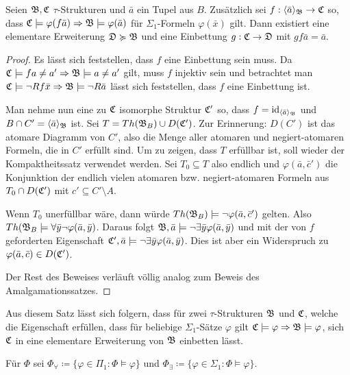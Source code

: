 \begin{satz}
	Seien $\mathfrak{B},\mathfrak{C}$ $\tau$-Strukturen und $\bar{a}$ ein Tupel aus $B$. Zusätzlich sei $f:\langle\bar{a}\rangle_{\mathfrak{B}}\to\mathfrak{C}$ so, dass $\mathfrak{C}\models\varphi(f\bar{a})\Rightarrow\mathfrak{B}\models\varphi(\bar{a})$ für $\Sigma_1$-Formeln $\varphi(\bar{x})$ gilt. Dann existiert eine elementare Erweiterung $\mathfrak{D}\succcurlyeq\mathfrak{B}$ und eine Einbettung $g:\mathfrak{C}\to\mathfrak{D}$ mit $gf\bar{a}=\bar{a}$.
\end{satz}
\begin{proof}
	Es lässt sich feststellen, dass $f$ eine Einbettung sein muss. Da $\mathfrak{C}\models fa\neq a'\Rightarrow \mathfrak{B}\models a\neq a'$ gilt, muss $f$ injektiv sein und betrachtet man $\mathfrak{C}\models\neg Rf\bar{x}\Rightarrow\mathfrak{B}\models\neg R\bar{a}$ lässt sich feststellen, dass $f$ eine Einbettung ist.
	
	Man nehme nun eine zu $\mathfrak{C}$ isomorphe Struktur $\mathfrak{C}'$ so, dass $f=\text{id}_{\langle\bar{a}\rangle_{\mathfrak{B}}}$ und $B\cap C'=\langle\bar{a}\rangle_{\mathfrak{B}}$ ist. Sei $T=Th(\mathfrak{B}_B)\cup D(\mathfrak{C}')$. Zur Erinnerung: $D(C')$ ist das atomare Diagramm von $C'$, also die Menge aller atomaren und negiert-atomaren Formeln, die in $C'$ erfüllt sind. 
	Um zu zeigen, dass $T$ erfüllbar ist, soll wieder der Kompaktheitssatz verwendet werden. 
	Sei $T_0\subseteq T$ also endlich und $\varphi(\bar{a},\bar{c}')$ die Konjunktion der endlich vielen atomaren bzw. negiert-atomaren Formeln aus $T_0\cap D(\mathfrak{C}')$ mit $c'\subseteq C'\setminus A$.
	
	Wenn $T_0$ unerfüllbar wäre, dann würde $Th(\mathfrak{B}_B)\models\neg\varphi(\bar{a},\bar{c}')$ gelten. Also $Th(\mathfrak{B}_B\models\forall\bar{y}\neg\varphi(\bar{a},\bar{y})$. Daraus folgt $\mathfrak{B},\bar{a}\models\neg\exists\bar{y}\varphi(\bar{a},\bar{y})$ und mit der von $f$ geforderten Eigenschaft $\mathfrak{C}',\bar{a}\models\neg\exists\bar{y}\varphi(\bar{a},\bar{y})$. Dies ist aber ein Widerspruch zu $\varphi(\bar{a},\bar{c})\in D(\mathfrak{C}')$.
	
	Der Rest des Beweises verläuft völlig analog zum Beweis des Amalgamationssatzes.
 \end{proof}
 
 Aus diesem Satz lässt sich folgern, dass für zwei $\tau$-Strukturen $\mathfrak{B}$ und $\mathfrak{C}$, welche die Eigenschaft erfüllen, dass für beliebige $\Sigma_1$-Sätze $\varphi$ gilt $\mathfrak{C}\models\varphi\Rightarrow\mathfrak{B}\models\varphi$, sich $\mathfrak{C}$ in eine elementare Erweiterung von $\mathfrak{B}$ einbetten lässt.

\begin{definition}
	Für $\Phi$ sei $\Phi_\forall\coloneqq\{\varphi\in\Pi_1 : \Phi\models\varphi\}$ und $\Phi_\exists\coloneqq\{\varphi\in\Sigma_1 : \Phi\models\varphi\}$.
\end{definition}

